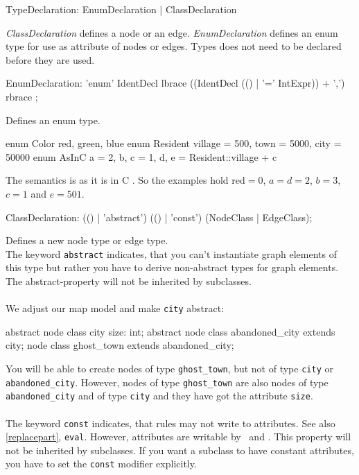 \begin{rail}
  TypeDeclaration: EnumDeclaration | ClassDeclaration
\end{rail}
\emph{ClassDeclaration} defines a node or an edge. \emph{EnumDeclaration} defines an enum type for use as attribute of nodes or edges. Types does not need to be declared before they are used.

\begin{rail}
  EnumDeclaration: 'enum' IdentDecl lbrace ((IdentDecl (() | '=' IntExpr)) + ',') rbrace ;
\end{rail}
Defines an enum type.\\
\begin{grgen}
enum Color {red, green, blue}
enum Resident {village = 500, town = 5000, city = 50000}
enum AsInC {a = 2, b, c = 1, d, e = Resident::village + c}
\end{grgen}
{\small The semantics is as it is in C \cite{isoc}. So the examples hold $\text{red} = 0$, $a=d=2$, $b=3$, $c=1$ and $e=501$.}

\begin{rail}  
  ClassDeclaration: (() | 'abstract') (() | 'const') (NodeClass | EdgeClass);
\end{rail}
Defines a new node type or edge type.\\
The keyword \texttt{abstract} indicates, that you can't instantiate graph elements of this type but rather you have to derive non-abstract types for graph elements. The abstract-property will not be inherited by subclasses.\\
{\small \\We adjust our map model and make \texttt{city} abstract:}
\begin{grgen}
abstract node class city {
	size: int;
}
abstract node class abandoned_city extends city;
node class ghost_town extends abandoned_city;
\end{grgen}
{\small You will be able to create nodes of type \texttt{ghost\_town}, but not of type \texttt{city} or \texttt{abandoned\_city}. However, nodes of type \texttt{ghost\_town} are also nodes of type \texttt{abandoned\_city} and of type \texttt{city} and they have got the attribute \texttt{size}}.\\
\\
The keyword \texttt{const} indicates, that rules may not write to attributes. See also \ref{replacepart}, \texttt{eval}. However, attributes are writable by \LibGr\ and \GrShell. This property will not be inherited by subclasses. If you want a subclass to have constant attributes, you have to set the \texttt{const} modifier explicitly.

